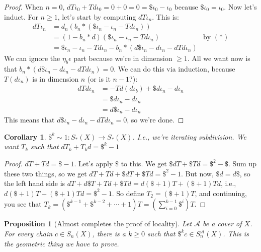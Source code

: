 \documentclass{amsart}
\theoremstyle{theorem}
\newtheorem{prop}[theorem]{Proposition}
\newtheorem{corollary}[theorem]{Corollary}
\theoremstyle{definition}
\newcommand{\sca}{\mathscr{A}}
\begin{document}
\begin{proof}
When $n=0$, $dT\iota_0 + Td\iota_0 = 0+0 = 0 = \$\iota_0 - \iota_0$ because $\$\iota_0=\iota_0$. Now let's induct. For $n\geq 1$, let's start by computing $dT\iota_n$. This is:
\begin{align*}
dT\iota_n & = d_n(b_n\ast(\$\iota_n - \iota_n - Td\iota_n)) & \\
& = (1-b_n\ast d)(\$\iota_n - \iota_n - Td\iota_n) & \text{by $(\ast)$}\\
 & = \$\iota_n-\iota_n-Td\iota_n-b_n\ast (d\$\iota_n - d\iota_n - dTd\iota_n)
\end{align*}
We can ignore the $\eta_b\epsilon$ part because we're in dimension $\geq 1$. All we want now is that $b_n\ast(d\$\iota_n - d\iota_n - dTd\iota_n)=0$. We can do this via induction, because $T(d\iota_n)$ is in dimension $n$ (or is it $n-1$?):
\begin{align*}
dTd\iota_n & = -Td(d\iota_b)+\$ d\iota_n - d\iota_n\\
& = \$d\iota_n - d\iota_n\\
& = d\$\iota_n - d\iota_n
\end{align*}
This means that $d\$\iota_n-d\iota_n - dTd\iota_n=0$, so we're done.
\end{proof}
\begin{corollary}
$\$^k\sim 1:S_\ast(X)\to S_\ast(X)$. I.e., we're iterating subdivision. We want $T_k$ such that $dT_k+T_kd=\$^k-1$
\end{corollary}
\begin{proof}
$dT+Td=\$-1$. Let's apply $\$$ to this. We get $\$dT+\$Td=\$^2-\$$. Sum up these two things, so we get $dT+Td+\$dT+\$Td = \$^2-1$. But now, $\$d=d\$$, so the left hand side is $dT+d\$T + Td+\$Td = d(\$+1)T + (\$+1)Td$, i.e., $d(\$+1)T+(\$+1)Td=\$^2-1$. So define $T_2=(\$+1)T$, and continuing, you see that $T_k=(\$^{k-1}+\$^{k-2}+\cdots+1)T=\left(\sum^{k-1}_{i=0}\$^i\right)T$.
\end{proof}
\begin{prop}[Almost completes the proof of locality]
Let $\sca$ be a cover of $X$. For every chain $c\in S_n(X)$, there is a $k\geq 0$ such that $\$^kc\in S^\sca_n(X)$. This is the geometric thing we have to prove.
\end{prop}
\end{document}
